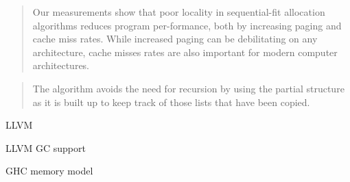 \documentclass[a4paper,oneside]{memoir}
\begin{document}
\blockquote{Our measurements show that poor locality in sequential-fit
allocation algorithms reduces program per-formance, both by increasing paging
and cache miss rates. While increased paging can be debilitating on any
architecture, cache misses rates are also important for modern computer
architectures. \cite{Grunwald:1993}}

\blockquote{The algorithm avoids the need for recursion by using the partial
structure as it is built up to keep track of those lists that have been copied.}
\cite{Cheney:1970}

LLVM\cite{LLVM}

LLVM GC support\cite{LLVMGC}

GHC memory model \cite{GHCCommentary}




%
\end{document}
